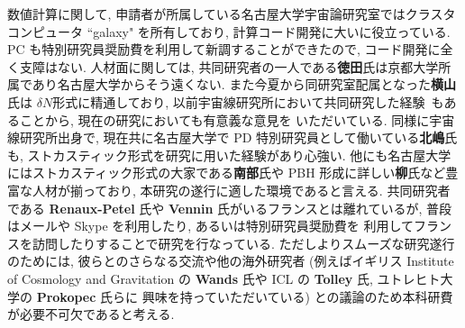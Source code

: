 \documentclass[11pt,a4j,dvipdfmx]{jarticle} 					%
\newcommand{\研究課題名}{\mgfamily\sffamily ストカスティック形式で迫る重力と量子論}
\newcommand{\研究機関名}{\mgfamily\sffamily 名古屋大学}
\newcommand{\研究代表者氏名}{\mgfamily\sffamily 多田祐一郎}
\newcommand{\研究期間の最終元号年度}{34}  %
\renewcommand{\emph}[1]{{\sffamily\gtfamily\bfseries #1}}
\begin{document}
数値計算に関して, 申請者が所属している名古屋大学宇宙論研究室ではクラスタコンピュータ ``galaxy" を所有しており, 計算コード開発に大いに役立っている.
PC も特別研究員奨励費を利用して新調することができたので, コード開発に全く支障はない.
人材面に関しては, 共同研究者の一人である\emph{徳田}氏は京都大学所属であり名古屋大学からそう遠くない. また今夏から同研究室配属となった\emph{横山}氏は
$\delta N$形式に精通しており, 以前宇宙線研究所において共同研究した経験~\cite{Tada:2015noa}もあることから, 現在の研究においても有意義な意見を
いただいている. 同様に宇宙線研究所出身で, 現在共に名古屋大学で PD 特別研究員として働いている\emph{北嶋}氏も, ストカスティック形式を研究に用いた経験があり心強い. 
他にも名古屋大学にはストカスティック形式の大家である\emph{南部}氏や PBH 形成に詳しい\emph{柳}氏など豊富な人材が揃っており, 本研究の遂行に適した環境であると言える.
共同研究者である \emph{Renaux-Petel} 氏や \emph{Vennin} 氏がいるフランスとは離れているが, 普段はメールや Skype を利用したり, あるいは特別研究員奨励費を
利用してフランスを訪問したりすることで研究を行なっている.
ただしよりスムーズな研究遂行のためには, 彼らとのさらなる交流や他の海外研究者 (例えばイギリス Institute of Cosmology and Gravitation の \emph{Wands} 氏や 
ICL の \emph{Tolley} 氏, 
ユトレヒト大学の \emph{Prokopec} 氏らに
興味を持っていただいている) との議論のため本科研費が必要不可欠であると考える.
\end{document}
